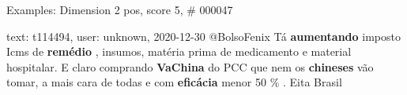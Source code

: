 \begin{frame}{Examples: Dimension 2 pos, score 5, \# 000047}
\footnotesize
\begin{exampleblock}{text: t114494, user: unknown, 2020-12-30}
@BolsoFenix Tá \textbf{aumentando} imposto Icms de \textbf{remédio} , insumos, 
matéria prima de medicamento e material hospitalar. E claro comprando 
\textbf{VaChina} do PCC que nem os \textbf{chineses} vão tomar, a mais cara de 
todas e com \textbf{eficácia} menor 50 \% . Eita Brasil 
\end{exampleblock}
\end{frame}
